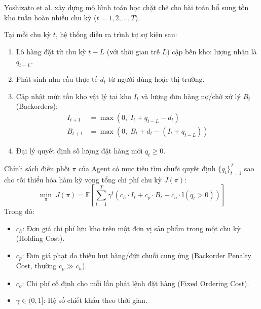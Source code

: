 \documentclass[11pt,a4paper]{article}
\begin{document}
Yoshizato et al. xây dựng mô hình toán học chặt chẽ cho bài toán bổ sung tồn kho tuần hoàn nhiều chu kỳ ($t = 1, 2, \dots, T$).

\begin{formulationbox}
Tại mỗi chu kỳ $t$, hệ thống diễn ra trình tự sự kiện sau:
\begin{enumerate}[leftmargin=1.5em]
    \item Lô hàng đặt từ chu kỳ $t - L$ (với thời gian trễ $L$) cập bến kho: lượng nhận là $q_{t-L}$.
    \item Phát sinh nhu cầu thực tế $d_t$ từ người dùng hoặc thị trường.
    \item Cập nhật mức tồn kho vật lý tại kho $I_t$ và lượng đơn hàng nợ/chờ xử lý $B_t$ (Backorders):
    \begin{align}
        I_{t+1} &= \max\left(0, \; I_t + q_{t-L} - d_t\right) \\
        B_{t+1} &= \max\left(0, \; B_t + d_t - (I_t + q_{t-L})\right)
    \end{align}
    \item Đại lý quyết định số lượng đặt hàng mới $q_t \ge 0$.
\end{enumerate}
\end{formulationbox}

\begin{formulationbox}
Chính sách điều phối $\pi$ của Agent có mục tiêu tìm chuỗi quyết định $\{q_t\}_{t=1}^T$ sao cho tối thiểu hóa hàm kỳ vọng tổng chi phí chu kỳ $J(\pi)$:
\begin{equation}
    \min_{\pi} \; J(\pi) = \mathbb{E}\left[ \sum_{t=1}^{T} \gamma^t \left( c_h \cdot I_t + c_p \cdot B_t + c_o \cdot \mathbb{I}(q_t > 0) \right) \right]
\end{equation}
Trong đó:
\begin{itemize}[leftmargin=1.5em]
    \item $c_h$: Đơn giá chi phí lưu kho trên một đơn vị sản phẩm trong một chu kỳ (Holding Cost).
    \item $c_p$: Đơn giá phạt do thiếu hụt hàng/đứt chuỗi cung ứng (Backorder Penalty Cost, thường $c_p \gg c_h$).
    \item $c_o$: Chi phí cố định cho mỗi lần phát lệnh đặt hàng (Fixed Ordering Cost).
    \item $\gamma \in (0, 1]$: Hệ số chiết khấu theo thời gian.
\end{itemize}
\end{formulationbox}
\end{document}
